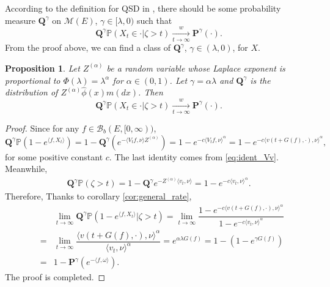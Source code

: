 \documentclass[12pt,a4paper]{amsart}
\numberwithin{equation}{section}
\theoremstyle{plain}
\newtheorem{prop}[thm]{Proposition}
\theoremstyle{definition}
\begin{document}
{\color{blue}According to the definition for QSD in \cite{ChampagnatVillemonais2018Convergence}, there should be some probability measure $\mathbf Q^\gamma$ on $\mathcal M(E)$, $\gamma\in[\lambda, 0)$ such that
  \[
    \mathbf Q^{\gamma}\mathbb P(X_t \in \cdot | \zeta > t) \xrightarrow[t\to \infty]{w} {\mathbf P^\gamma}(\cdot).
  \]
  From the proof above, we can find a class of $\mathbf Q^\gamma$, $\gamma\in (\lambda, 0)$, for $X$.
  \begin{prop}
    Let $Z^{(\alpha)}$ be a random variable whose Laplace exponent is proportional to $\Phi(\lambda)=\lambda^{\alpha}$ for $\alpha\in(0,1)$.  Let $\gamma=\alpha\lambda$ and $\mathbf Q^{\gamma}$ is the distribution of $Z^{(\alpha)}\widehat\phi(x)m(dx)$.  Then
    \[
      \mathbf Q^{\gamma}\mathbb P(X_t \in \cdot | \zeta > t) \xrightarrow[t\to \infty]{w} {\mathbf P^\gamma}(\cdot).
    \]
  \end{prop}
  \begin{proof}
    Since for any $f\in\mathcal B_b(E,[0,\infty))$,
    \[
      \mathbf Q^{\gamma}\mathbb P\left(1-e^{\langle f, X_t\rangle }\right)=1-\mathbf Q^{\gamma}\left(e^{-\langle V_tf,\nu\rangle Z^{(\alpha)}}\right)
      =1-e^{-c\langle V_tf,\nu\rangle^\alpha}=1-e^{-c\langle v(t+G(f),\cdot),\nu\rangle^\alpha},
    \]
    for some positive constant $c$. The last identity comes from \eqref{eq:ident_Vv}.  Meanwhile,
    \begin{eqnarray*}
      \mathbf Q^{\gamma}\mathbb P(\zeta>t)=1-\mathbf Q^{\gamma}e^{-Z^{(\alpha)}\langle v_t,\nu\rangle }=1-e^{-c\langle v_t,\nu\rangle^\alpha}.
    \end{eqnarray*}
    Therefore, Thanks to corollary \ref{cor:general_rate},
    \begin{eqnarray*}
      &&\lim_{t\to\infty}\mathbf Q^{\gamma}\mathbb P\left(1-e^{\langle f, X_t\rangle }\big|\zeta>t\right)=\lim_{t\to\infty}\dfrac{1-e^{-c\langle v(t+G(f),\cdot),\nu\rangle^\alpha}}{1-e^{-c\langle v_t,\nu\rangle^\alpha}}\\
      &=&\lim_{t\to\infty}\dfrac{\langle v(t+G(f),\cdot),\nu\rangle^\alpha}{\langle v_t,\nu\rangle^\alpha}= e^{\alpha\lambda G(f)}=1-(1-e^{\gamma G(f)})\\
      &=&1-\mathbf P^{\gamma}(e^{-\langle f,\omega\rangle}).
    \end{eqnarray*}
    The proof is completed.
  \end{proof}
}
\end{document}
